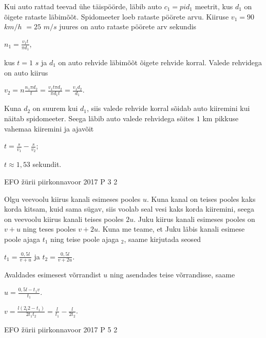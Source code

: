 \documentclass[11pt]{article}
\begin{document}
{{\ifSolution
Kui auto rattad teevad ühe täispöörde, läbib auto $c_1 = pi d_1$ meetrit, kus $d_1$ on õigete rataste läbimõõt. 
\newline
Spidomeeter loeb rataste pöörete arvu. Kiiruse $v_1 = 90$ $km/h$ $= 25$ $m/s$ juures on auto rataste pöörete arv sekundis
\begin{center}
$n_1 =\frac{v_1 t}{\pi d_1}$,
\end{center}
kus $t = 1$ $s$ ja $d_1$ on auto rehvide läbimõõt õigete rehvide korral. Valede rehvidega on auto kiirus
\begin{center}
$v_2 = n\frac{n_1\pi d_2}{t} = \frac{v_1 t \pi d_2}{\pi d_1 t} = \frac{v_1 d_2}{d_1}$.
\end{center}
Kuna $d_2$ on suurem kui $d_1$, siis valede rehvide korral sõidab auto kiiremini kui näitab spidomeeter. Seega läbib auto valede rehvidega sõites $1$ km pikkuse vahemaa kiiremini ja ajavõit
\begin{center}
$t = \frac{s}{v_1} - \frac{s}{v_2}$;
\end{center}
\begin{center}
$t \approx 1,53$ sekundit.
\end{center}
\fi
}

{EFO žürii} %
{piirkonnavoor} %
{2017} %
{P 3} %
{2} %
{

\ifSolution
Olgu veevoolu kiirus kanali esimeses pooles $u$. Kuna kanal on teises pooles kaks korda kitsam, kuid sama sügav, siis voolab seal vesi kaks korda kiiremini, seega on veevoolu kiirus kanali teises pooles $2u$. Juku kiirus kanali esimeses pooles on $v + u$ ning teses pooles $v + 2u$. Kuna me teame, et Juku läbis kanali esimese poole ajaga $t_1$ ning teise poole ajaga $_2$, saame kirjutada seosed
\begin{center}
$t_1 = \frac{0,5l}{v + u}$ ja $t_2 = \frac{0,5 l}{v + 2u}$. 
\end{center}
Avaldades esimesest võrrandist $u$ ning asendades teise võrrandisse, saame
\begin{center}
$u = \frac{0,5l - t_1 v}{t_1}$.
\end{center}
\begin{center}
$v = \frac{l(2_t2 - t_1)}{2t_1t_2} = \frac{l}{t_1} - \frac{l}{2t_2}$.
\end{center}
\fi
}

{EFO žürii} %
{piirkonnavoor} %
{2017} %
{P 5} %
{2} %
{

}}
\end{document}
